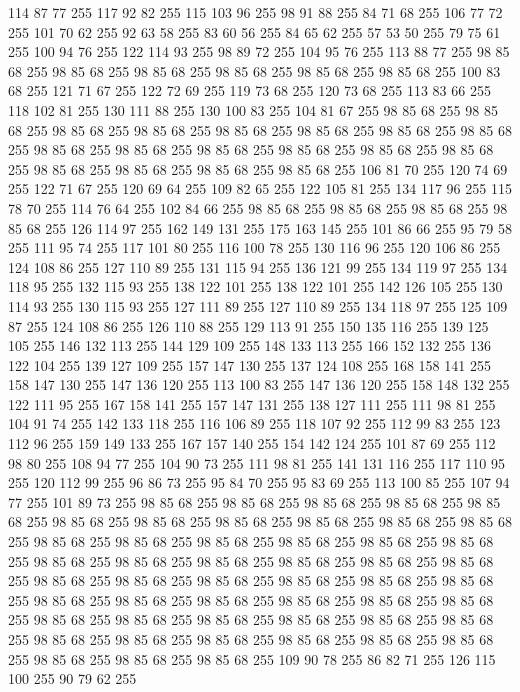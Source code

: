 114 87 77 255 117 92 82 255 115 103 96 255 98 91 88 255 84 71 68 255 106 77 72 255 101 70 62 255 92 63 58 255 83 60 56 255 84 65 62 255 57 53 50 255 79 75 61 255 100 94 76 255 122 114 93 255 98 89 72 255 104 95 76 255 113 88 77 255 98 85 68 255 98 85 68 255 98 85 68 255 98 85 68 255 98 85 68 255 98 85 68 255 100 83 68 255 121 71 67 255 122 72 69 255 119 73 68 255 120 73 68 255 113 83 66 255 118 102 81 255 130 111 88 255 130 100 83 255 104 81 67 255 98 85 68 255 98 85 68 255 98 85 68 255 98 85 68 255 98 85 68 255 98 85 68 255 98 85 68 255 98 85 68 255 98 85 68 255 98 85 68 255 98 85 68 255 98 85 68 255 98 85 68 255 98 85 68 255 98 85 68 255 98 85 68 255 98 85 68 255 98 85 68 255 106 81 70 255 120 74 69 255 122 71 67 255 120 69 64 255 109 82 65 255 122 105 81 255 134 117 96 255 115 78 70 255 114 76 64 255 102 84 66 255 98 85 68 255 98 85 68 255 98 85 68 255
98 85 68 255 126 114 97 255 162 149 131 255 175 163 145 255 101 86 66 255 95 79 58 255 111 95 74 255 117 101 80 255 116 100 78 255 130 116 96 255 120 106 86 255 124 108 86 255 127 110 89 255 131 115 94 255 136 121 99 255 134 119 97 255 134 118 95 255 132 115 93 255 138 122 101 255 138 122 101 255 142 126 105 255 130 114 93 255 130 115 93 255 127 111 89 255 127 110 89 255 134 118 97 255 125 109 87 255 124 108 86 255 126 110 88 255 129 113 91 255 150 135 116 255 139 125 105 255 146 132 113 255 144 129 109 255 148 133 113 255 166 152 132 255 136 122 104 255 139 127 109 255 157 147 130 255 137 124 108 255 168 158 141 255 158 147 130 255 147 136 120 255 113 100 83 255 147 136 120 255 158 148 132 255 122 111 95 255 167 158 141 255 157 147 131 255 138 127 111 255 111 98 81 255 104 91 74 255 142 133 118 255 116 106 89 255 118 107 92 255 112 99 83 255 123 112 96 255 159 149 133 255 167 157 140 255 154 142 124 255 101 87 69 255 112 98 80 255 108 94 77 255 104 90 73 255
111 98 81 255 141 131 116 255 117 110 95 255 120 112 99 255 96 86 73 255 95 84 70 255 95 83 69 255 113 100 85 255 107 94 77 255 101 89 73 255 98 85 68 255 98 85 68 255 98 85 68 255 98 85 68 255 98 85 68 255 98 85 68 255 98 85 68 255 98 85 68 255 98 85 68 255 98 85 68 255 98 85 68 255 98 85 68 255 98 85 68 255 98 85 68 255 98 85 68 255 98 85 68 255 98 85 68 255 98 85 68 255 98 85 68 255 98 85 68 255 98 85 68 255 98 85 68 255 98 85 68 255 98 85 68 255 98 85 68 255 98 85 68 255 98 85 68 255 98 85 68 255 98 85 68 255 98 85 68 255 98 85 68 255 98 85 68 255 98 85 68 255 98 85 68 255 98 85 68 255 98 85 68 255 98 85 68 255 98 85 68 255 98 85 68 255 98 85 68 255 98 85 68 255 98 85 68 255 98 85 68 255 98 85 68 255 98 85 68 255 98 85 68 255 98 85 68 255 98 85 68 255 98 85 68 255 98 85 68 255 109 90 78 255 86 82 71 255 126 115 100 255 90 79 62 255
